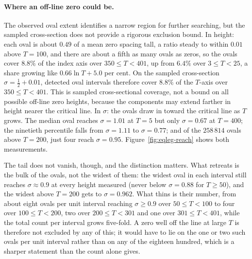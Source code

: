 \documentclass[11pt]{article}
\theoremstyle{definition}
\begin{document}
\paragraph{Where an off-line zero could be.} The observed oval extent
identifies a narrow region for further searching, but the sampled
cross-section does not provide a rigorous exclusion bound. In height: each
oval is about $0.49$ of a mean
zero spacing tall, a ratio steady to within $0.01$ above $T=100$, and there are about a fifth as many ovals as zeros, so the
ovals cover $8.8\%$ of the index axis over $350\le T<401$, up from $6.4\%$ over
$3\le T<25$, a share growing like $0.66\ln T+5.0$ per cent. On the sampled
cross-section $\sigma=\tfrac12+0.01$, detected oval intervals therefore cover
$8.8\%$ of the $T$-axis over $350\leq T<401$. This is sampled cross-sectional
coverage, not a bound on all possible off-line zero heights, because the
components may extend farther in height nearer the critical line. In $\sigma$:
the ovals draw in toward the critical line as $T$ grows. The
median oval reaches $\sigma=1.01$ at $T=5$ but only $\sigma=0.67$ at $T=400$;
the ninetieth percentile falls from $\sigma=1.11$ to $\sigma=0.77$;
and of the $258\,814$ ovals above $T=200$, just four reach $\sigma=0.95$.
Figure~\ref{fig:eqleg-reach} shows both measurements.

The tail does not vanish, though, and the distinction matters. What retreats is
the bulk of the ovals, not the widest of them: the widest oval in each interval
still reaches $\sigma\approx0.9$ at every height measured (never below
$\sigma=0.88$ for $T\ge50$), and the widest above
$T=200$ gets to $\sigma=0.962$. What thins is their number, from about eight
ovals per unit interval reaching $\sigma\ge0.9$ over $50\le T<100$ to four over
$100\le T<200$, two over $200\le T<301$ and one over $301\le T<401$, while the
total count per interval grows five-fold. A zero well off the line at large $T$
is therefore not excluded by any
of this; it would have to lie on the one or two such ovals per unit interval
rather than on any of the eighteen hundred, which is a sharper statement than the
count alone gives.
\end{document}
